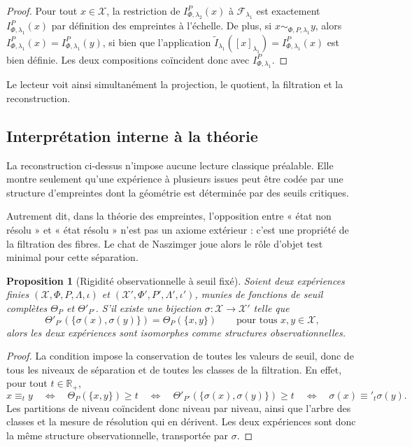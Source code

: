 \documentclass[11pt,a4paper,openany]{book}
\newtheorem{proposition}[definition]{Proposition}
\begin{document}
\begin{proof}
Pour tout \(x\in\mathcal X\), la restriction de \(I_{\Phi,\lambda_2}^P(x)\) à \(\mathcal F_{\lambda_1}\) est exactement \(I_{\Phi,\lambda_1}^P(x)\) par définition des empreintes à l'échelle. De plus, si \(x\sim_{\Phi,P,\lambda_1}y\), alors \(I_{\Phi,\lambda_1}^P(x)=I_{\Phi,\lambda_1}^P(y)\), si bien que l'application \(\widetilde I_{\lambda_1}([x]_{\lambda_1})=I_{\Phi,\lambda_1}^P(x)\) est bien définie. Les deux compositions coïncident donc avec \(I_{\Phi,\lambda_1}^P\).
\end{proof}

Le lecteur voit ainsi simultanément la projection, le quotient, la filtration et la reconstruction.

\subsection{Interprétation interne à la théorie}

La reconstruction ci-dessus n'impose aucune lecture classique préalable. Elle montre seulement qu'une expérience à plusieurs issues peut être codée par une structure d'empreintes dont la géométrie est déterminée par des seuils critiques.

Autrement dit, dans la théorie des empreintes, l'opposition entre « état non résolu » et « état résolu » n'est pas un axiome extérieur : c'est une propriété de la filtration des fibres. Le chat de Naszimger joue alors le rôle d'objet test minimal pour cette séparation.

\begin{proposition}[Rigidité observationnelle à seuil fixé]
Soient deux expériences finies \((\mathcal X,\Phi,P,\Lambda,\iota)\) et \((\mathcal X',\Phi',P',\Lambda',\iota')\), munies de fonctions de seuil complètes \(\Theta_P\) et \(\Theta'_{P'}\). S'il existe une bijection \(\sigma:\mathcal X\to\mathcal X'\) telle que
\[
\Theta'_{P'}(\{\sigma(x),\sigma(y)\})=\Theta_P(\{x,y\})
\qquad\text{pour tous }x,y\in\mathcal X,
\]
alors les deux expériences sont isomorphes comme structures observationnelles.
\end{proposition}

\begin{proof}
La condition impose la conservation de toutes les valeurs de seuil, donc de tous les niveaux de séparation et de toutes les classes de la filtration. En effet, pour tout \(t\in\mathbb R_+\),
\[
x\equiv_t y
\quad\Longleftrightarrow\quad
\Theta_P(\{x,y\})\ge t
\quad\Longleftrightarrow\quad
\Theta'_{P'}(\{\sigma(x),\sigma(y)\})\ge t
\quad\Longleftrightarrow\quad
\sigma(x)\equiv'_t \sigma(y).
\]
Les partitions de niveau coïncident donc niveau par niveau, ainsi que l'arbre des classes et la mesure de résolution qui en dérivent. Les deux expériences sont donc la même structure observationnelle, transportée par \(\sigma\).
\end{proof}
\end{document}
